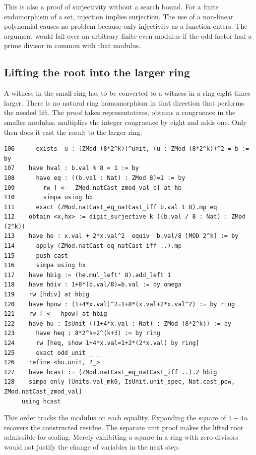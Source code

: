 \documentclass[12pt,letterpaper]{article}
\begin{document}
This is also a proof of surjectivity without a search bound. For a finite endomorphism of a set, injection implies surjection. The use of a non-linear polynomial causes no problem because only injectivity as a function enters. The argument would fail over an arbitrary finite even modulus if the odd factor had a prime divisor in common with that modulus.
\clearpage{}\subsection*{Lifting the root into the larger ring}
A witness in the small ring has to be converted to a witness in a ring eight times larger. There is no natural ring homomorphism in that direction that performs the needed lift. The proof takes representatives, obtains a congruence in the smaller modulus, multiplies the integer congruence by eight and adds one. Only then does it cast the result to the larger ring.
\par
{\fontsize{8.8}{10.5}\selectfont\begin{verbatim}
106      exists  u : (ZMod (8*2^k))^unit, (u : ZMod (8*2^k))^2 = b := by
107    have hval : b.val % 8 = 1 := by
108      have eq : ((b.val : Nat) : ZMod 8)=1 := by
109        rw [ <-  ZMod.natCast_zmod_val b] at hb
110        simpa using hb
111      exact (ZMod.natCast_eq_natCast_iff b.val 1 8).mp eq
112    obtain <x,hx> := digit_surjective k ((b.val / 8 : Nat) : ZMod (2^k))
113    have he : x.val + 2*x.val^2  equiv  b.val/8 [MOD 2^k] := by
114      apply (ZMod.natCast_eq_natCast_iff ..).mp
115      push_cast
116      simpa using hx
117    have hbig := (he.mul_left' 8).add_left 1
118    have hdiv : 1+8*(b.val/8)=b.val := by omega
119    rw [hdiv] at hbig
120    have hpow : (1+4*x.val)^2=1+8*(x.val+2*x.val^2) := by ring
121    rw [ <-  hpow] at hbig
122    have hu : IsUnit ((1+4*x.val : Nat) : ZMod (8*2^k)) := by
123      have heq : 8*2^k=2^(k+3) := by ring
124      rw [heq, show 1+4*x.val=1+2*(2*x.val) by ring]
125      exact odd_unit _ _
126    refine <hu.unit, ?_>
127    have hcast := (ZMod.natCast_eq_natCast_iff ..).2 hbig
128    simpa only [Units.val_mk0, IsUnit.unit_spec, Nat.cast_pow, ZMod.natCast_zmod_val]
     using hcast
\end{verbatim}}
This order tracks the modulus on each equality. Expanding the square of $1+4u$ recovers the constructed residue. The separate unit proof makes the lifted root admissible for scaling. Merely exhibiting a square in a ring with zero divisors would not justify the change of variables in the next step.
\end{document}
